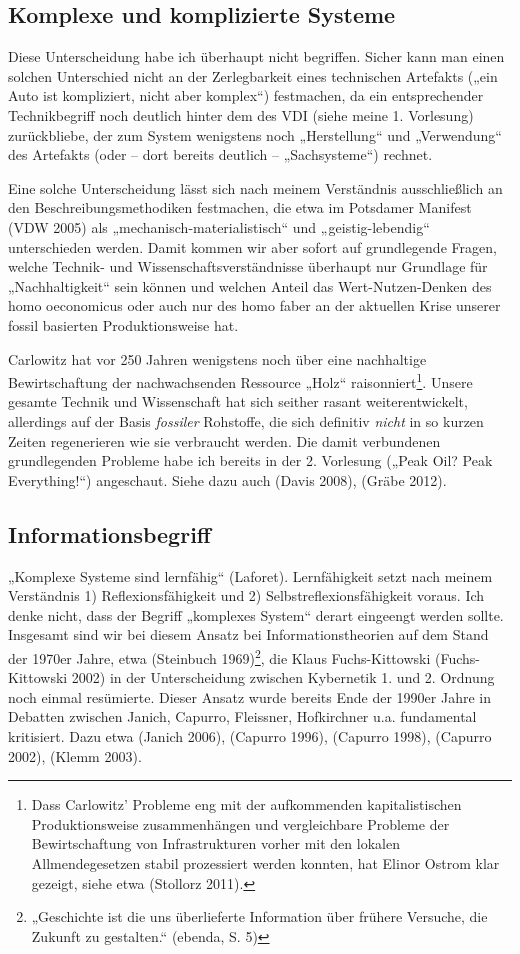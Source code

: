 \documentclass[11pt,a4paper]{article}
\begin{document}
\subsection{Komplexe und komplizierte Systeme}

Diese Unterscheidung habe ich überhaupt nicht begriffen. Sicher kann man einen
solchen Unterschied nicht an der Zerlegbarkeit eines technischen Artefakts
(„ein Auto ist kompliziert, nicht aber komplex“) festmachen, da ein
entsprechender Technikbegriff noch deutlich hinter dem des VDI (siehe meine
1. Vorlesung) zurückbliebe, der zum System wenigstens noch „Herstellung“ und
„Verwendung“ des Artefakts (oder -- dort bereits deutlich -- „Sachsysteme“)
rechnet.

Eine solche Unterscheidung lässt sich nach meinem Verständnis ausschließlich
an den Beschreibungsmethodiken festmachen, die etwa im Potsdamer Manifest (VDW
2005) als „mechanisch-materialistisch“ und „geistig-lebendig“ unterschieden
werden.  Damit kommen wir aber sofort auf grundlegende Fragen, welche Technik-
und Wissenschaftsverständnisse überhaupt nur Grundlage für „Nachhaltigkeit“
sein können und welchen Anteil das Wert-Nutzen-Denken des homo oeconomicus
oder auch nur des homo faber an der aktuellen Krise unserer fossil basierten
Produktionsweise hat.

Carlowitz hat vor 250 Jahren wenigstens noch über eine nachhaltige
Bewirtschaftung der nachwachsenden Ressource „Holz“ raisonniert\footnote{Dass
  Carlowitz' Probleme eng mit der aufkommenden kapitalistischen
  Produktionsweise zusammenhängen und vergleichbare Probleme der
  Bewirtschaftung von Infrastrukturen vorher mit den lokalen Allmendegesetzen
  stabil prozessiert werden konnten, hat Elinor Ostrom klar gezeigt, siehe
  etwa (Stollorz 2011). }. Unsere gesamte Technik und Wissenschaft hat sich
seither rasant weiterentwickelt, allerdings auf der Basis \emph{fossiler}
Rohstoffe, die sich definitiv \emph{nicht} in so kurzen Zeiten regenerieren
wie sie verbraucht werden.  Die damit verbundenen grundlegenden Probleme habe
ich bereits in der 2. Vorlesung („Peak Oil? Peak Everything!“) angeschaut.
Siehe dazu auch (Davis 2008), (Gräbe 2012).

\subsection{Informationsbegriff}

„Komplexe Systeme sind lernfähig“ (Laforet). Lernfähigkeit setzt nach meinem
Verständnis 1) Reflexionsfähigkeit und 2) Selbstreflexionsfähigkeit voraus.
Ich denke nicht, dass der Begriff „komplexes System“ derart eingeengt werden
sollte.  Insgesamt sind wir bei diesem Ansatz bei Informationstheorien auf dem
Stand der 1970er Jahre, etwa (Steinbuch 1969)\footnote{„Geschichte ist die uns
  überlieferte Information über frühere Versuche, die Zukunft zu gestalten.“
  (ebenda, S. 5)}, die Klaus Fuchs-Kittowski (Fuchs-Kittowski 2002) in der
Unterscheidung zwischen Kybernetik 1. und 2. Ordnung noch einmal resümierte.
Dieser Ansatz wurde bereits Ende der 1990er Jahre in Debatten zwischen Janich,
Capurro, Fleissner, Hofkirchner u.a. fundamental kritisiert. Dazu etwa (Janich
2006), (Capurro 1996), (Capurro 1998), (Capurro 2002), (Klemm 2003).
\end{document}
